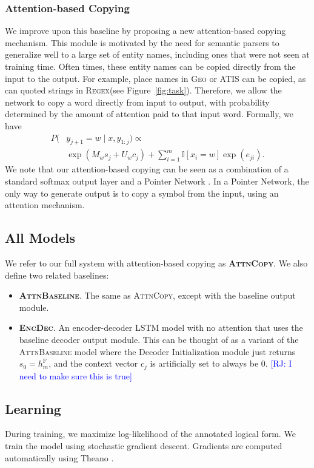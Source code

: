 \documentclass[11pt,letterpaper]{article}
\newcommand{\encdec}{\textsc{EncDec}\xspace}
\newcommand{\attn}{\textsc{AttnBaseline}\xspace}
\newcommand{\attncopy}{\textsc{AttnCopy}\xspace}
\newcommand{\atis}{\textsc{ATIS}\xspace}
\newcommand{\regex}{\textsc{Regex}\xspace}
\newcommand{\geo}{\textsc{Geo}\xspace}
\newcommand\rj[1]{\textcolor{blue}{[RJ: #1]}}
\begin{document}
\subsubsection{Attention-based Copying}
We improve upon this baseline by proposing a new 
attention-based copying mechanism.
This module is motivated by the need for semantic parsers
to generalize well to a large set of entity names,
including ones that were not seen at training time.
Often times, these entity names
can be copied directly from the input to the output.
For example, place names in \geo or \atis can be copied,
as can quoted strings in \regex (see Figure~\ref{fig:task}).
Therefore, we allow the network to copy a word directly from input to output,
with probability determined by the amount of attention paid to that input word.
Formally, we have
\begin{align}
  P(&y_{j+1} = w \mid x, y_{1:j}) \propto 
  \\ & \exp(M_{w} s_j + U_w c_j)
  + \sum_{i=1}^m \mathbb{I}[x_i = w] \exp(e_{ji}).
\end{align}
We note that our attention-based copying can be seen as a 
combination of a standard softmax output layer
and a Pointer Network \cite{vinyals2015pointer}.  In a Pointer Network,
the only way to generate output is to copy a symbol from the input,
using an attention mechanism.

\subsection{All Models}
We refer to our full system with attention-based copying as \textbf{\attncopy}.
We also define two related baselines:
\begin{itemize}
  \item \textbf{\attn}.  The same as \attncopy, except with the baseline 
    output module.
  \item \textbf{\encdec}.  An encoder-decoder LSTM model with no attention
    that uses the baseline decoder output module.  
    This can be thought of as a variant of the \attn model
    where the Decoder Initialization module
    just returns $s_0 = h_m^{\text{F}}$,
    and the context vector $c_j$ is artificially set to always be $0$.
    \rj{I need to make sure this is true}
\end{itemize}

\subsection{Learning}
During training, we maximize log-likelihood of the annotated logical form.
We train the model using stochastic gradient descent.
Gradients are computed automatically using Theano \cite{bergstra2010theano}.
\end{document}
